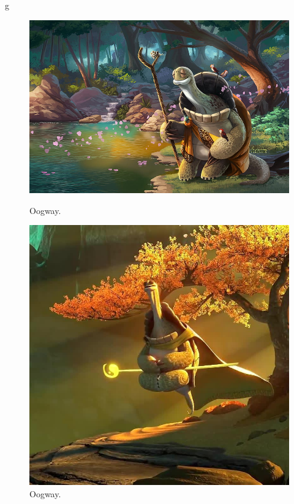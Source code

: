 g\documentclass{article}
\begin{document}
\begin{figure}[h]
    \centering
    \begin{minipage}{0.45\textwidth}
        \includegraphics[width=\textwidth]{rysunek2.png}
        \caption{Oogway.}
    \end{minipage}
    \hfill
    \begin{minipage}{0.45\textwidth}
        \includegraphics[width=\textwidth]{rysunek3.png}
        \caption{Oogway.}
    \end{minipage}
\end{figure}
\end{document}
